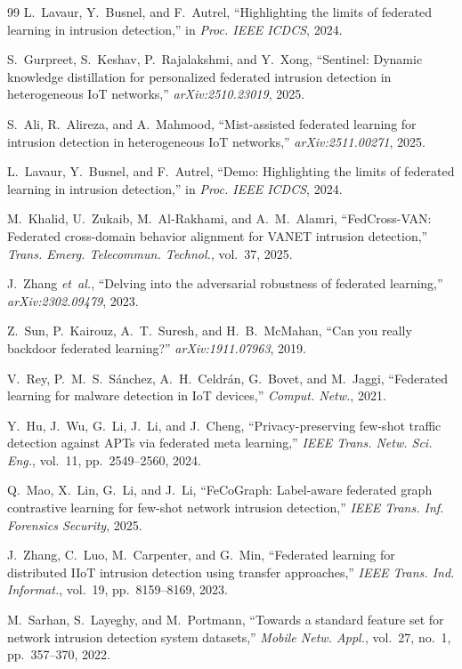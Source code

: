 \documentclass[11pt,a4paper]{article}
\begin{document}
\begin{thebibliography}{99}
 L.~Lavaur, Y.~Busnel, and F.~Autrel, ``Highlighting the limits
of federated learning in intrusion detection,'' in \emph{Proc. IEEE ICDCS}, 2024.

 S.~Gurpreet, S.~Keshav, P.~Rajalakshmi, and Y.~Xong,
``Sentinel: Dynamic knowledge distillation for personalized federated intrusion
detection in heterogeneous IoT networks,'' \emph{arXiv:2510.23019}, 2025.

 S.~Ali, R.~Alireza, and A.~Mahmood, ``Mist-assisted federated
learning for intrusion detection in heterogeneous IoT networks,''
\emph{arXiv:2511.00271}, 2025.

 L.~Lavaur, Y.~Busnel, and F.~Autrel, ``Demo: Highlighting the
limits of federated learning in intrusion detection,'' in \emph{Proc. IEEE
ICDCS}, 2024.

 M.~Khalid, U.~Zukaib, M.~Al-Rakhami, and A.~M.~Alamri,
``FedCross-VAN: Federated cross-domain behavior alignment for VANET intrusion
detection,'' \emph{Trans. Emerg. Telecommun. Technol.}, vol.~37, 2025.

 J.~Zhang \emph{et~al.}, ``Delving into the adversarial
robustness of federated learning,'' \emph{arXiv:2302.09479}, 2023.

 Z.~Sun, P.~Kairouz, A.~T.~Suresh, and H.~B.~McMahan, ``Can you
really backdoor federated learning?'' \emph{arXiv:1911.07963}, 2019.

 V.~Rey, P.~M.~S.~S\'anchez, A.~H.~Celdr\'an, G.~Bovet, and
M.~Jaggi, ``Federated learning for malware detection in IoT devices,''
\emph{Comput. Netw.}, 2021.

 Y.~Hu, J.~Wu, G.~Li, J.~Li, and J.~Cheng, ``Privacy-preserving
few-shot traffic detection against APTs via federated meta learning,'' \emph{IEEE
Trans. Netw. Sci. Eng.}, vol.~11, pp.~2549--2560, 2024.

 Q.~Mao, X.~Lin, G.~Li, and J.~Li, ``FeCoGraph: Label-aware
federated graph contrastive learning for few-shot network intrusion detection,''
\emph{IEEE Trans. Inf. Forensics Security}, 2025.

 J.~Zhang, C.~Luo, M.~Carpenter, and G.~Min, ``Federated
learning for distributed IIoT intrusion detection using transfer approaches,''
\emph{IEEE Trans. Ind. Informat.}, vol.~19, pp.~8159--8169, 2023.

 M.~Sarhan, S.~Layeghy, and M.~Portmann, ``Towards a standard
feature set for network intrusion detection system datasets,'' \emph{Mobile Netw.
Appl.}, vol.~27, no.~1, pp.~357--370, 2022.


\end{thebibliography}
\end{document}
